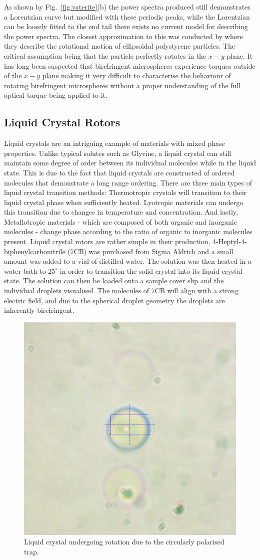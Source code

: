 As shown by Fig.~\ref{fig:vaterite}(b) the power spectra produced still 
demonstrates a Lorentzian curve but modified with these periodic peaks, 
while the Lorentzian can be loosely fitted to the end tail there exists 
no current model for describing the power spectra. The closest approximation
to this was conducted by \cite{Yogesha2012} where they describe the 
rotational motion of ellipsoidal polystyrene particles. The critical 
assumption being that the particle perfectly rotates in the $x-y$ plane. 
It has long been suspected that birefringent microspheres experience torques 
outside of the $x-y$ plane \cite{Volpe2023} making it very difficult to 
characterise the behaviour of rotating birefringent microspheres without a 
proper understanding of the full optical torque being applied to it.

\subsection{Liquid Crystal Rotors}
Liquid crystals are an intriguing example of materials with mixed phase
properties. Unlike typical solutes such as Glycine, a liquid crystal
can still maintain some degree of order between its individual molecules
while in the liquid state. This is due to the fact that liquid crystals
are constructed of ordered molecules that demonstrate a long range
ordering. There are three main types of liquid crystal transition methods:
Thermotropic crystals will transition to their liquid crystal phase when 
sufficiently heated. Lyotropic materials can undergo this transition due 
to changes in temperature and concentration. And lastly, Metallotropic 
materials - which are composed of both organic and inorganic molecules - 
change phase according to the ratio of organic to inorganic molecules present.
Liquid crystal rotors are rather simple in their production, 
4-Heptyl-4-biphenylcarbonitrile (7CB) was purchased from Sigma Aldrich
and a small amount was added to a vial of distilled water. The solution 
was then heated in a water bath to $25^\circ$ in order to transition the
solid crystal into its liquid crystal state. The solution can then be 
loaded onto a sample cover slip and the individual droplets visualised.
The molecules of 7CB will align with a strong electric field, and due to
the spherical droplet geometry the droplets are inherently birefringent. 
\begin{figure}[h!]
	\centering
	\includegraphics[width=0.5\linewidth]{LC_sample.png}
	\caption{Liquid crystal undergoing rotation due to the circularly polarised trap.} 
\end{figure}

